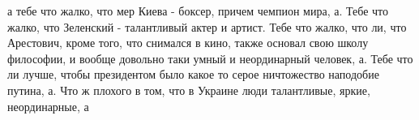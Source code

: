  
 
 
 
 

а тебе что жалко, что мер Киева - боксер, причем чемпион мира, а. Тебе что
жалко, что Зеленский - талантливый актер и артист. Тебе что жалко, что ли, что
Арестович, кроме того, что снимался в кино, также основал свою школу философии,
и вообще довольно таки умный и неординарный человек, а. Тебе что ли лучше,
чтобы президентом было какое то серое ничтожество наподобие путина, а. Что ж
плохого в том, что в Украине люди талантливые, яркие, неординарные, а







